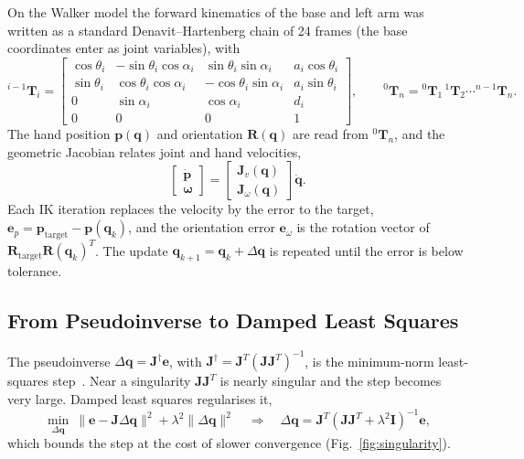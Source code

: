 \documentclass[12pt,a4paper]{article}
\begin{document}
On the Walker model the forward kinematics of the base and left arm was written as a standard
Denavit--Hartenberg chain of 24 frames (the base coordinates enter as joint variables), with
\begin{equation}
    {}^{i-1}\mathbf{T}_{i} =
    \begin{bmatrix}
        \cos\theta_i & -\sin\theta_i\cos\alpha_i & \sin\theta_i\sin\alpha_i & a_i\cos\theta_i\\
        \sin\theta_i & \cos\theta_i\cos\alpha_i & -\cos\theta_i\sin\alpha_i & a_i\sin\theta_i\\
        0 & \sin\alpha_i & \cos\alpha_i & d_i\\
        0 & 0 & 0 & 1
    \end{bmatrix},
    \qquad
    {}^{0}\mathbf{T}_{n} = {}^{0}\mathbf{T}_{1}\,{}^{1}\mathbf{T}_{2}\cdots{}^{n-1}\mathbf{T}_{n}.
\end{equation}
The hand position $\mathbf{p}(\mathbf{q})$ and orientation $\mathbf{R}(\mathbf{q})$ are read from
${}^{0}\mathbf{T}_{n}$, and the geometric Jacobian relates joint and hand velocities,
\begin{equation}
    \begin{bmatrix}\dot{\mathbf{p}}\\ \boldsymbol{\omega}\end{bmatrix}
    = \begin{bmatrix}\mathbf{J}_v(\mathbf{q})\\ \mathbf{J}_\omega(\mathbf{q})\end{bmatrix}\dot{\mathbf{q}}.
\end{equation}
Each IK iteration replaces the velocity by the error to the target,
$\mathbf{e}_p = \mathbf{p}_{\mathrm{target}}-\mathbf{p}(\mathbf{q}_k)$, and the orientation error
$\mathbf{e}_\omega$ is the rotation vector of $\mathbf{R}_{\mathrm{target}}\mathbf{R}(\mathbf{q}_k)^{T}$.
The update $\mathbf{q}_{k+1}=\mathbf{q}_k+\Delta\mathbf{q}$ is repeated until the error is below
tolerance.

\subsection{From Pseudoinverse to Damped Least Squares}

The pseudoinverse $\Delta\mathbf{q}=\mathbf{J}^{\dagger}\mathbf{e}$, with
$\mathbf{J}^{\dagger}=\mathbf{J}^{T}(\mathbf{J}\mathbf{J}^{T})^{-1}$, is the minimum-norm least-squares
step~\cite{buss2009}. Near a singularity $\mathbf{J}\mathbf{J}^{T}$ is nearly singular and the step
becomes very large. Damped least squares regularises it,
\begin{equation}
    \min_{\Delta\mathbf{q}}\ \|\mathbf{e}-\mathbf{J}\Delta\mathbf{q}\|^2 + \lambda^2\|\Delta\mathbf{q}\|^2
    \quad\Rightarrow\quad
    \Delta\mathbf{q} = \mathbf{J}^{T}\left(\mathbf{J}\mathbf{J}^{T}+\lambda^2\mathbf{I}\right)^{-1}\mathbf{e},
\end{equation}
which bounds the step at the cost of slower convergence (Fig.~\ref{fig:singularity}).
\end{document}
